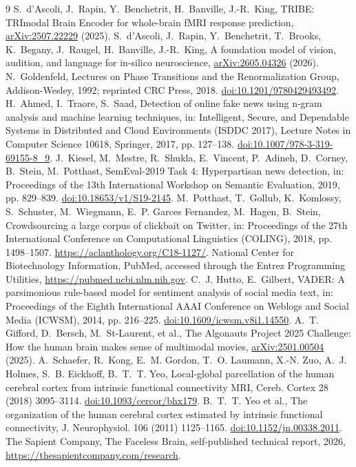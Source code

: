 \begin{thebibliography}{9}
 S.~d'Ascoli, J.~Rapin, Y.~Benchetrit, H.~Banville, J.-R.~King, TRIBE: TRImodal Brain Encoder for whole-brain fMRI response prediction, \href{https://arxiv.org/abs/2507.22229}{arXiv:2507.22229} (2025).
 S.~d'Ascoli, J.~Rapin, Y.~Benchetrit, T.~Brooks, K.~Begany, J.~Raugel, H.~Banville, J.-R.~King, A foundation model of vision, audition, and language for in-silico neuroscience, \href{https://arxiv.org/abs/2605.04326}{arXiv:2605.04326} (2026).
 N.~Goldenfeld, Lectures on Phase Transitions and the Renormalization Group, Addison-Wesley, 1992; reprinted CRC Press, 2018. \href{https://doi.org/10.1201/9780429493492}{doi:10.1201/9780429493492}.
 H.~Ahmed, I.~Traore, S.~Saad, Detection of online fake news using n-gram analysis and machine learning techniques, in: Intelligent, Secure, and Dependable Systems in Distributed and Cloud Environments (ISDDC 2017), Lecture Notes in Computer Science 10618, Springer, 2017, pp. 127--138. \href{https://doi.org/10.1007/978-3-319-69155-8_9}{doi:10.1007/978-3-319-69155-8\_9}.
 J.~Kiesel, M.~Mestre, R.~Shukla, E.~Vincent, P.~Adineh, D.~Corney, B.~Stein, M.~Potthast, SemEval-2019 Task 4: Hyperpartisan news detection, in: Proceedings of the 13th International Workshop on Semantic Evaluation, 2019, pp. 829--839. \href{https://doi.org/10.18653/v1/S19-2145}{doi:10.18653/v1/S19-2145}.
 M.~Potthast, T.~Gollub, K.~Komlossy, S.~Schuster, M.~Wiegmann, E.~P. Garces Fernandez, M.~Hagen, B.~Stein, Crowdsourcing a large corpus of clickbait on Twitter, in: Proceedings of the 27th International Conference on Computational Linguistics (COLING), 2018, pp. 1498--1507. \url{https://aclanthology.org/C18-1127/}.
 National Center for Biotechnology Information, PubMed, accessed through the Entrez Programming Utilities, \url{https://pubmed.ncbi.nlm.nih.gov}.
 C.~J. Hutto, E.~Gilbert, VADER: A parsimonious rule-based model for sentiment analysis of social media text, in: Proceedings of the Eighth International AAAI Conference on Weblogs and Social Media (ICWSM), 2014, pp. 216--225. \href{https://doi.org/10.1609/icwsm.v8i1.14550}{doi:10.1609/icwsm.v8i1.14550}.
 A.~T. Gifford, D.~Bersch, M.~St-Laurent, et al., The Algonauts Project 2025 Challenge: How the human brain makes sense of multimodal movies, \href{https://arxiv.org/abs/2501.00504}{arXiv:2501.00504} (2025).
 A.~Schaefer, R.~Kong, E.~M. Gordon, T.~O. Laumann, X.-N. Zuo, A.~J. Holmes, S.~B. Eickhoff, B.~T.~T. Yeo, Local-global parcellation of the human cerebral cortex from intrinsic functional connectivity MRI, Cereb. Cortex 28 (2018) 3095--3114. \href{https://doi.org/10.1093/cercor/bhx179}{doi:10.1093/cercor/bhx179}.
 B.~T.~T. Yeo et al., The organization of the human cerebral cortex estimated by intrinsic functional connectivity, J. Neurophysiol. 106 (2011) 1125--1165. \href{https://doi.org/10.1152/jn.00338.2011}{doi:10.1152/jn.00338.2011}.
 The Sapient Company, The Faceless Brain, self-published technical report, 2026, \url{https://thesapientcompany.com/research}.
\end{thebibliography}

